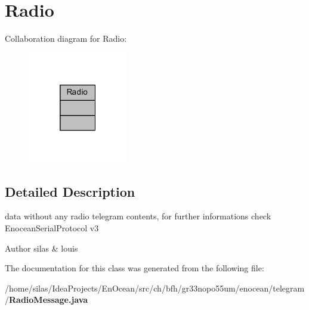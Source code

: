 \section{Radio}
\label{classRadio}


Collaboration diagram for Radio\+:\nopagebreak
\begin{figure}[H]
\begin{center}
\leavevmode
\includegraphics[width=124pt]{df/dd6/classRadio__coll__graph}
\end{center}
\end{figure}


\subsection{Detailed Description}
data without any radio telegram contents, for further informations check Enocean\+Serial\+Protocol v3

\begin{DoxyAuthor}{Author}
silas \& louis 
\end{DoxyAuthor}


The documentation for this class was generated from the following file\+:\begin{DoxyCompactItemize}
\item 
/home/silas/\+Idea\+Projects/\+En\+Ocean/src/ch/bfh/gr33nopo55um/enocean/telegram/{\bf Radio\+Message.\+java}\end{DoxyCompactItemize}
